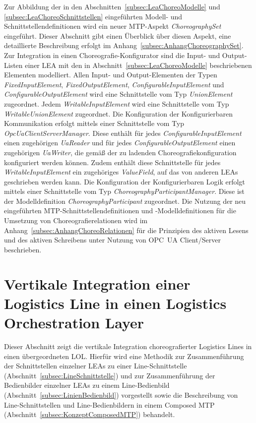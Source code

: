 Zur Abbildung der in den Abschnitten~\ref{subsec:LeaChoreoModelle} und \ref{subsec:LeaChoreoSchnittstellen} eingeführten Modell- und Schnittstellendefinitionen wird ein neuer MTP-Aspekt \emph{ChoreographySet} eingeführt. Dieser Abschnitt gibt einen Überblick über diesen Aspekt, eine detaillierte Beschreibung erfolgt im Anhang~\ref{subsec:AnhangChoreographySet}. Zur Integration in einen Choreografie-Konfigurator sind die Input- und Output-Listen einer LEA mit den in Abschnitt~\ref{subsec:LeaChoreoModelle} beschriebenen Elementen modelliert. Allen Input- und Output-Elementen der Typen \emph{FixedInputElement}, \emph{FixedOutputElement}, \emph{ConfigurableInputElement} und \emph{ConfigurableOutputElement} wird eine Schnittstelle vom Typ \emph{UnionElement} zugeordnet. Jedem \emph{WritableInputElement} wird eine Schnittstelle vom Typ \emph{WritableUnionElement} zugeordnet. Die Konfiguration der Konfigurierbaren Kommunikation erfolgt mittels einer Schnittstelle vom Typ \emph{OpcUaClientServerManager}. Diese enthält für jedes \emph{ConfigurableInputElement} einen zugehörigen \emph{UaReader} und für jedes \emph{ConfigurableOutputElement} einen zugehörigen \emph{UaWriter}, die gemäß der zu ladenden Choreografiekonfiguration konfiguriert werden können. Zudem enthält diese Schnittstelle für jedes \emph{WritableInputElement} ein zugehöriges \emph{ValueField}, auf das von anderen LEAs geschrieben werden kann. Die Konfiguration der Konfigurierbaren Logik erfolgt mittels einer Schnittstelle vom Typ \emph{ChoreographyParticipantManager}. Diese ist der Modelldefinition \emph{ChoreographyParticipant} zugeordnet. Die Nutzung der neu eingeführten MTP-Schnittstellendefinitionen und -Mo\-dell\-de\-fi\-ni\-tio\-nen für die Umsetzung von Choreografierelationen wird im Anhang~\ref{subsec:AnhangChoreoRelationen} für die Prinzipien des aktiven Lesens und des aktiven Schreibens unter Nutzung von OPC~UA Client/Server beschrieben.


\section{Vertikale Integration einer Logistics Line in einen Logistics Orchestration Layer}
\label{sec:ChoreoVertikal}

Dieser Abschnitt zeigt die vertikale Integration choreografierter Logistics Lines in einen übergeordneten LOL. Hierfür wird eine Methodik zur Zusammenführung der Schnittstellen einzelner LEAs zu einer Line-Schnittstelle (Abschnitt~\ref{subsec:LineSchnittstelle}) und zur Zusammenführung der Bedienbilder einzelner LEAs zu einem Line-Bedienbild (Abschnitt~\ref{subsec:LinienBedienbild}) vorgestellt sowie die Beschreibung von Line-Schnittstellen und Line-Bedienbildern in einem Composed MTP (Abschnitt~\ref{subsec:KonzeptComposedMTP}) behandelt.

